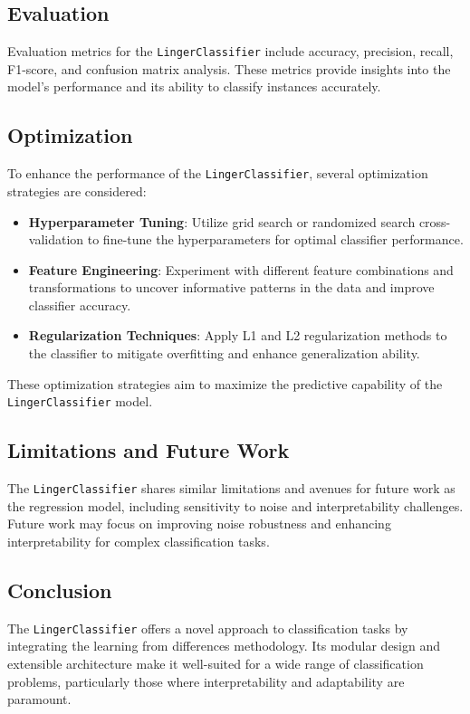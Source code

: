 \documentclass[a4paper, 12pt]{report}
\begin{document}
\subsection{Evaluation}
Evaluation metrics for the \texttt{LingerClassifier} include accuracy, precision, recall, F1-score, and confusion matrix analysis. 
These metrics provide insights into the model's performance and its ability to classify instances accurately.

\subsection{Optimization}
To enhance the performance of the \texttt{LingerClassifier}, several optimization strategies are considered:
\begin{itemize}
    \item \textbf{Hyperparameter Tuning}: Utilize grid search or randomized search cross-validation to fine-tune the hyperparameters for optimal classifier performance.
    
    \item \textbf{Feature Engineering}: Experiment with different feature combinations and transformations to uncover informative patterns in the data and improve classifier accuracy.
    
    \item \textbf{Regularization Techniques}: Apply L1 and L2 regularization methods to the classifier to mitigate overfitting and enhance generalization ability.
\end{itemize}

These optimization strategies aim to maximize the predictive capability of the \texttt{LingerClassifier} model.

\subsection{Limitations and Future Work}
The \texttt{LingerClassifier} shares similar limitations and avenues for future work as the regression model, including sensitivity to noise and interpretability challenges. 
Future work may focus on improving noise robustness and enhancing interpretability for complex classification tasks.

\subsection{Conclusion}
The \texttt{LingerClassifier} offers a novel approach to classification tasks by integrating the learning from differences methodology. 
Its modular design and extensible architecture make it well-suited for a wide range of classification problems, particularly those where interpretability and adaptability are paramount.
\end{document}
